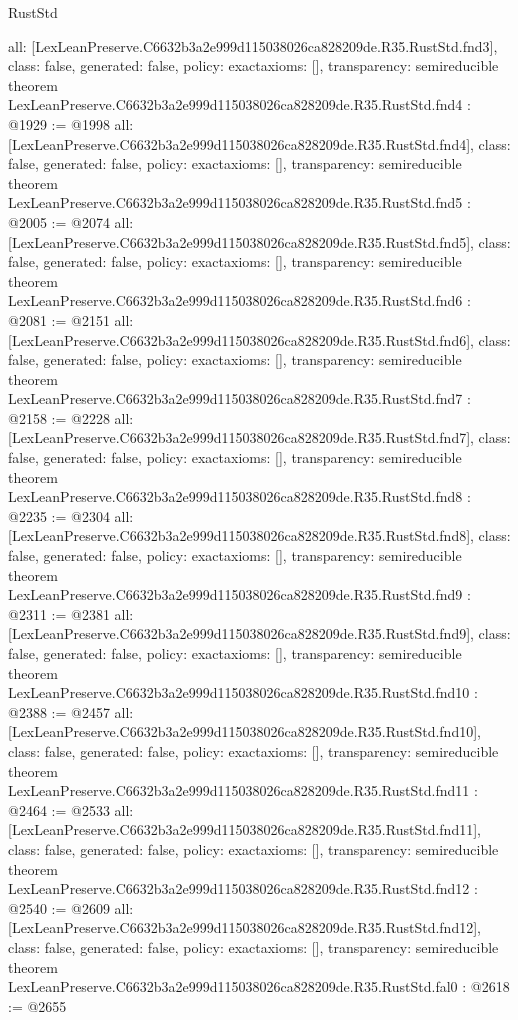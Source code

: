 \begin{lexlean}{RustStd}
\begin{coremodule}
{  all: [LexLeanPreserve.C6632b3a2e999d115038026ca828209de.R35.RustStd.fnd3],
  class: false,
  generated: false,
  policy: exact{axioms: []},
  transparency: semireducible
}
theorem LexLeanPreserve.C6632b3a2e999d115038026ca828209de.R35.RustStd.fnd4 : @1929 := @1998 {
  all: [LexLeanPreserve.C6632b3a2e999d115038026ca828209de.R35.RustStd.fnd4],
  class: false,
  generated: false,
  policy: exact{axioms: []},
  transparency: semireducible
}
theorem LexLeanPreserve.C6632b3a2e999d115038026ca828209de.R35.RustStd.fnd5 : @2005 := @2074 {
  all: [LexLeanPreserve.C6632b3a2e999d115038026ca828209de.R35.RustStd.fnd5],
  class: false,
  generated: false,
  policy: exact{axioms: []},
  transparency: semireducible
}
theorem LexLeanPreserve.C6632b3a2e999d115038026ca828209de.R35.RustStd.fnd6 : @2081 := @2151 {
  all: [LexLeanPreserve.C6632b3a2e999d115038026ca828209de.R35.RustStd.fnd6],
  class: false,
  generated: false,
  policy: exact{axioms: []},
  transparency: semireducible
}
theorem LexLeanPreserve.C6632b3a2e999d115038026ca828209de.R35.RustStd.fnd7 : @2158 := @2228 {
  all: [LexLeanPreserve.C6632b3a2e999d115038026ca828209de.R35.RustStd.fnd7],
  class: false,
  generated: false,
  policy: exact{axioms: []},
  transparency: semireducible
}
theorem LexLeanPreserve.C6632b3a2e999d115038026ca828209de.R35.RustStd.fnd8 : @2235 := @2304 {
  all: [LexLeanPreserve.C6632b3a2e999d115038026ca828209de.R35.RustStd.fnd8],
  class: false,
  generated: false,
  policy: exact{axioms: []},
  transparency: semireducible
}
theorem LexLeanPreserve.C6632b3a2e999d115038026ca828209de.R35.RustStd.fnd9 : @2311 := @2381 {
  all: [LexLeanPreserve.C6632b3a2e999d115038026ca828209de.R35.RustStd.fnd9],
  class: false,
  generated: false,
  policy: exact{axioms: []},
  transparency: semireducible
}
theorem LexLeanPreserve.C6632b3a2e999d115038026ca828209de.R35.RustStd.fnd10 : @2388 := @2457 {
  all: [LexLeanPreserve.C6632b3a2e999d115038026ca828209de.R35.RustStd.fnd10],
  class: false,
  generated: false,
  policy: exact{axioms: []},
  transparency: semireducible
}
theorem LexLeanPreserve.C6632b3a2e999d115038026ca828209de.R35.RustStd.fnd11 : @2464 := @2533 {
  all: [LexLeanPreserve.C6632b3a2e999d115038026ca828209de.R35.RustStd.fnd11],
  class: false,
  generated: false,
  policy: exact{axioms: []},
  transparency: semireducible
}
theorem LexLeanPreserve.C6632b3a2e999d115038026ca828209de.R35.RustStd.fnd12 : @2540 := @2609 {
  all: [LexLeanPreserve.C6632b3a2e999d115038026ca828209de.R35.RustStd.fnd12],
  class: false,
  generated: false,
  policy: exact{axioms: []},
  transparency: semireducible
}
theorem LexLeanPreserve.C6632b3a2e999d115038026ca828209de.R35.RustStd.fal0 : @2618 := @2655 {
}
\end{coremodule}
\end{lexlean}
